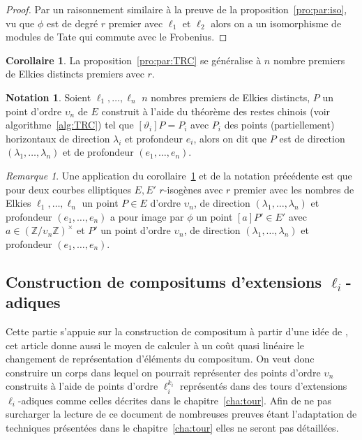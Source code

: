 \documentclass[10pt,a4paper]{book}
\theoremstyle{plain}
\theoremstyle{definition}
\theoremstyle{definition}
\newtheorem{cor}[thm]{Corollaire}
\theoremstyle{definition}
\theoremstyle{definition}
\theoremstyle{remark}
\newtheorem{rem}[thm]{Remarque}
\theoremstyle{remark}
\theoremstyle{definition}
\newtheorem{nota}[thm]{Notation}
\begin{document}
\begin{proof}
Par un raisonnement similaire à la preuve de la proposition~\ref{pro:par:iso}, 
vu que $\phi$ est de degré $r$ premier avec $\ell_1$ et $\ell_2$ alors on a un 
isomorphisme de modules de Tate qui commute avec le Frobenius.
\end{proof}

\begin{cor} 
\label{cor:par:TRC}
La proposition~\ref{pro:par:TRC} se généralise à $n$ nombre premiers de Elkies 
distincts premiers avec $r$.
\end{cor}

\begin{nota}
Soient $\ell_1, \dots, \ell_n$ $n$ nombres premiers de Elkies distincts, $P$ un
 point d'ordre $\upsilon_n$ de $E$ construit à l'aide du 
 théorème des restes chinois (voir algorithme~\ref{alg:TRC}) tel que 
$[\vartheta_i]P=P_i$ avec $P_i$ des points (partiellement) horizontaux de 
direction $\lambda_i$ et profondeur $e_i$, alors 
on dit que $P$ est de direction $(\lambda_1, \dots, \lambda_n)$ et de 
profondeur $(e_1, \dots, e_n)$. 
\end{nota}

\begin{rem}
Une application du corollaire~\ref{cor:par:TRC} et de la notation 
précédente est que pour deux courbes elliptiques $E,E'$ $r$-isogènes avec $r$ 
premier avec les nombres de Elkies $\ell_1, \dots, \ell_n$ un point $P \in E$ 
d'ordre $\upsilon_n$, de direction $(\lambda_1, \dots, \lambda_n)$ et 
profondeur $(e_1, \dots, e_n)$ a pour image par $\phi$ un point $[a]P' \in E'$
avec $a \in (\mathbb{Z}/\upsilon_n \mathbb{Z})^{\times}$ et $P'$ un 
point d'ordre $\upsilon_n$, de direction $(\lambda_1, \dots, \lambda_n)$ et 
profondeur $(e_1, \dots, e_n)$.
\end{rem}


\subsection{Construction de compositums d'extensions $\ell_i$-adiques}
\label{sub:con:com}

Cette partie s'appuie sur la construction de compositum à partir d'une idée de
\cite{DeFeoDoliskaniSchost14}, cet article donne aussi le moyen de calculer à un coût quasi 
linéaire le changement de représentation d'éléments du compositum. On veut donc
construire un corps dans lequel on pourrait représenter des points d'ordre 
$\upsilon_n$ construits à l'aide de points d'ordre $\ell_i^{k_i}$ représentés 
dans des tours d'extensions $\ell_i$-adiques comme celles décrites dans le 
chapitre~\ref{cha:tour}. Afin de ne pas surcharger la lecture de ce 
document de nombreuses preuves étant l'adaptation de techniques présentées 
dans le chapitre~\ref{cha:tour} elles ne seront pas détaillées.
\end{document}
